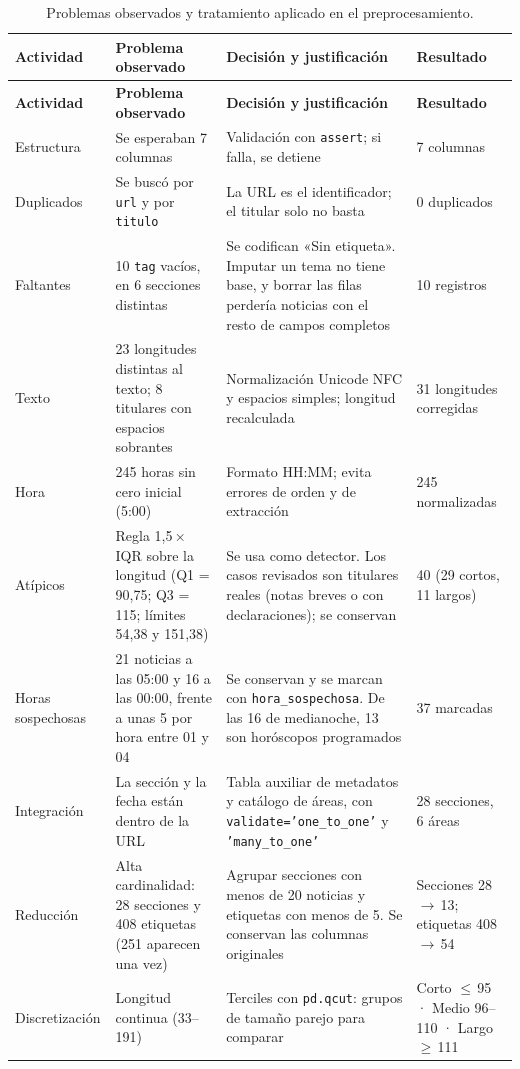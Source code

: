 \documentclass[12pt,a4paper]{article}
\begin{document}
{\small
\begin{longtable}{p{2.3cm}p{3.9cm}p{5.4cm}p{2.6cm}}
\caption{Problemas observados y tratamiento aplicado en el preprocesamiento.}\\
\toprule
\textbf{Actividad} & \textbf{Problema observado} & \textbf{Decisión y justificación} & \textbf{Resultado}\\\midrule
\endfirsthead
\toprule
\textbf{Actividad} & \textbf{Problema observado} & \textbf{Decisión y justificación} & \textbf{Resultado}\\\midrule
\endhead
Estructura & Se esperaban 7 columnas & Validación con \texttt{assert}; si falla, se detiene & 7 columnas\\
Duplicados & Se buscó por \texttt{url} y por \texttt{titulo} & La URL es el identificador; el titular solo no basta & 0 duplicados\\
Faltantes & 10 \texttt{tag} vacíos, en 6 secciones distintas & Se codifican «Sin etiqueta». Imputar un tema no tiene base, y borrar las filas perdería noticias con el resto de campos completos & 10 registros\\
Texto & 23 longitudes distintas al texto; 8 titulares con espacios sobrantes & Normalización Unicode NFC y espacios simples; longitud recalculada & 31 longitudes corregidas\\
Hora & 245 horas sin cero inicial (5:00) & Formato HH:MM; evita errores de orden y de extracción & 245 normalizadas\\
Atípicos & Regla 1,5\,×\,IQR sobre la longitud (Q1 = 90,75; Q3 = 115; límites 54,38 y 151,38) & Se usa como detector. Los casos revisados son titulares reales (notas breves o con declaraciones); se conservan & 40 (29 cortos, 11 largos)\\
Horas sospechosas & 21 noticias a las 05:00 y 16 a las 00:00, frente a unas 5 por hora entre 01 y 04 & Se conservan y se marcan con \texttt{hora\_sospechosa}. De las 16 de medianoche, 13 son horóscopos programados & 37 marcadas\\
Integración & La sección y la fecha están dentro de la URL & Tabla auxiliar de metadatos y catálogo de áreas, con \texttt{validate='one\_to\_one'} y \texttt{'many\_to\_one'} & 28 secciones, 6 áreas\\
Reducción & Alta cardinalidad: 28 secciones y 408 etiquetas (251 aparecen una vez) & Agrupar secciones con menos de 20 noticias y etiquetas con menos de 5. Se conservan las columnas originales & Secciones 28\,$\to$\,13; etiquetas 408\,$\to$\,54\\
Discretización & Longitud continua (33--191) & Terciles con \texttt{pd.qcut}: grupos de tamaño parejo para comparar & Corto $\le$\,95 · Medio 96--110 · Largo $\ge$\,111\\
\bottomrule
\end{longtable}
}
\end{document}
